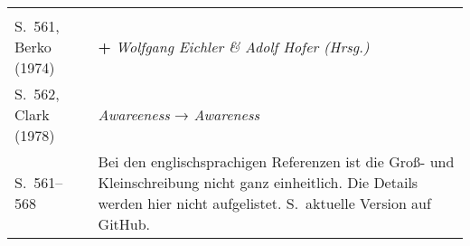 \documentclass[a5paper,11pt]{article}
\begin{document}
\begin{longtable}{p{}p{}}
{{                           }
                           \vspace{0.5\baselineskip}
                         }\\
  S.~561, Berko (1974) & \textbf{+} \textit{Wolfgang Eichler \& Adolf Hofer (Hrsg.)} \\
  S.~562, Clark (1978) & \textit{Awareeness} → \textit{Awareness} \\
  S.~561–568           & Bei den englischsprachigen Referenzen ist die Groß- und Kleinschreibung nicht ganz einheitlich. Die Details werden hier nicht aufgelistet. S.~aktuelle Version auf GitHub.\\
\end{longtable}
\end{document}
